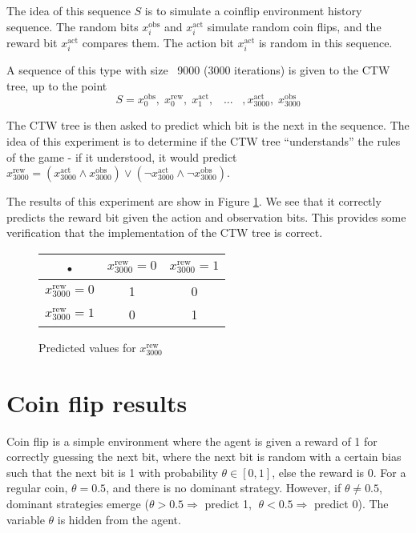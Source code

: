 \documentclass[pdftex,twoside,a4paper]{report}
\newcommand{\bcen}{\begin{center}}
\newcommand{\ecen}{\end{center}}
\begin{document}
The idea of this sequence $S$ is to simulate a coinflip environment history sequence. The random bits $x^{\text{obs}}_i$ and $x^{\text{act}}_i$ simulate random coin flips, and the reward bit $x^{\text{act}}_i$ compares them. The action bit $x^{\text{act}}_i$ is random in this sequence.

A sequence of this type with size ~9000 (3000 iterations) is given to the CTW tree, up to the point
\[
S = x^{\text{obs}}_0,\; x^{\text{rew}}_0,\; x^{\text{act}}_1,\;\;\;...\;\;\;,x^{\text{act}}_{3000},\;x^{\text{obs}}_{3000}
\]

The CTW tree is then asked to predict which bit is the next in the sequence. The idea of this experiment is to determine if the CTW tree ``understands'' the rules of the game - if it understood, it would predict $x^{\text{rew}}_{3000} = (x^{\text{act}}_{3000} \land x^{\text{obs}}_{3000}) \lor (\lnot x^{\text{act}}_{3000} \land \lnot x^{\text{obs}}_{3000})$.

The results of this experiment are show in Figure \ref{tab:non_det_seq_pred}. We see that it correctly predicts the reward bit given the action and observation bits. This provides some verification that the implementation of the CTW tree is correct.
\begin{figure}
\bcen
\bgroup
\def\arraystretch{1.5}
\begin{tabular}{c |c| c }
 • & $x^{\text{rew}}_{3000} = 0$ & $x^{\text{rew}}_{3000} = 1$ \\ 
\hline $x^{\text{rew}}_{3000} = 0$ & 1 & 0 \\ 
\hline $x^{\text{rew}}_{3000} = 1$ & 0 & 1 \\  
\end{tabular}
\egroup
\ecen
\caption{Predicted values for $x^{\text{rew}}_{3000}$}
\label{tab:non_det_seq_pred}
\end{figure}

\section{Coin flip results}

 Coin flip is a simple environment where the agent is given a reward of 1 for correctly guessing the next bit, where the next bit is random with a certain bias such that the next bit is 1 with probability $\theta \in [0,1]$, else the reward is 0. For a regular coin, $\theta = 0.5$, and there is no dominant strategy. However, if $\theta \not = 0.5$, dominant strategies emerge ($\theta > 0.5 \Rightarrow $ predict 1, $\; \theta < 0.5 \Rightarrow $ predict 0). The variable $\theta$ is hidden from the agent.
 
\end{document}
